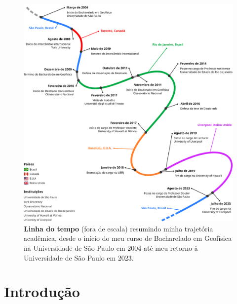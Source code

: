 \documentclass[12pt,a4paper,oneside]{book}
\newcommand{\USP}{Universidade de São Paulo}
\begin{document}
\begin{figure}[tb]
  \begin{center}
    \includegraphics[width=\textwidth]{images/timeline.pdf}
  \end{center}
  \caption*{
    \textbf{Linha do tempo} (fora de escala) resumindo minha trajetória
    acadêmica, desde o início do meu curso de Bacharelado em Geofísica na
    \USP{} em 2004 até meu retorno à \USP{} em 2023.
  }
\end{figure}

\tableofcontents

\mainmatter
\pagestyle{fancy}

\chapter{Introdução}
\end{document}
